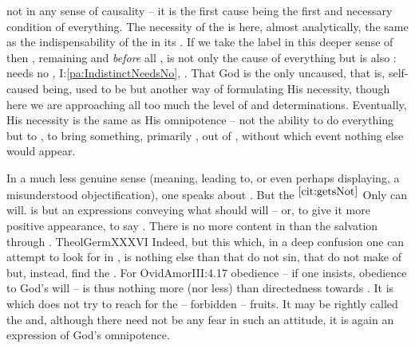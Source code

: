 not in any sense of  causality -- it is the first cause being the
first and necessary condition of everything. The necessity of the  is
here, almost analytically, the same as the indispensability of the
 in its .  If we take the label
 in this deeper sense of  then , remaining
 and {\em before} all , is not only the
cause of everything but is also :  needs no
, I:\ref{pa:IndistinctNeedsNo}, .
That God is the only uncaused, that is, self-caused being, used to be but
another way of formulating His necessity, though here we are approaching all too
much the level of  and  determinations.  Eventually,
His necessity is the same as His omnipotence -- not the ability to do everything
but to , to bring something, primarily , out of
, without which event nothing else would appear. 

\pa In a much less genuine sense (meaning, leading to, or even perhaps
displaying, a misunderstood {objectification}), one speaks 
about .
But the $^{\ref{cit:getsNot}}$ Only
 can will.   is but an expressions conveying what
 should will --  or, to give it more positive appearance, to
say \yes. There is no more content in  than the salvation
through .  \citet{Sin is nothing else than that the creature willeth
  otherwise than God willeth, and contrary to Him.}{TheolGerm}{XXXVI} Indeed,
but this  which, in a deep confusion one can attempt to look
for in , is nothing else than that  do not sin, that
 do not make  of  but, instead, find the
.  For 
\citet{We strive always for the forbidden, and we desire things
  denied.}{OvidAmor}{III:4.17}  obedience -- if one insists, obedience to
God's will -- is thus nothing more (nor less) than directedness towards \Yes. It
is  which does not try to reach for the  -- forbidden
-- fruits. It may be rightly called the  and, although there
need not be any  fear in such an attitude, it is again an expression
of God's omnipotence.  


